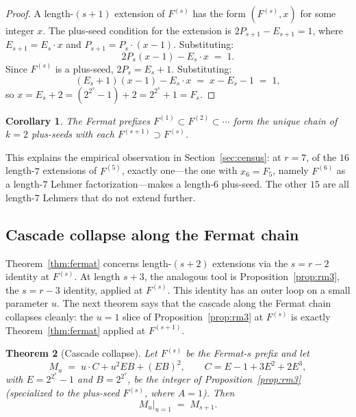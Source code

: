 \documentclass[11pt]{article}
\newtheorem{theorem}{Theorem}
\newtheorem{corollary}[theorem]{Corollary}
\theoremstyle{definition}
\theoremstyle{remark}
\begin{document}
\begin{proof}
A length-$(s+1)$ extension of $F^{(s)}$ has the form $(F^{(s)}, x)$
for some integer $x$.  The plus-seed condition for the extension is
$2 P_{s+1} - E_{s+1} = 1$, where $E_{s+1} = E_s \cdot x$ and
$P_{s+1} = P_s \cdot (x - 1)$.  Substituting:
\[
  2 P_s (x - 1) - E_s \cdot x \;=\; 1.
\]
Since $F^{(s)}$ is a plus-seed, $2 P_s = E_s + 1$.  Substituting:
\[
  (E_s + 1)(x - 1) - E_s \cdot x \;=\; x - E_s - 1 \;=\; 1,
\]
so $x = E_s + 2 = (2^{2^s} - 1) + 2 = 2^{2^s} + 1 = F_s$.
\end{proof}

\begin{corollary}\label{cor:chain-unique}
The Fermat prefixes $F^{(1)} \subset F^{(2)} \subset \cdots$ form
the unique chain of $k = 2$ plus-seeds with each
$F^{(s+1)} \supset F^{(s)}$.
\end{corollary}

This explains the empirical observation in
Section~\ref{sec:census}: at $r = 7$, of the $16$ length-$7$
extensions of $F^{(5)}$, exactly one---the one with $x_6 = F_5$, namely
$F^{(6)}$ as a length-$7$ Lehmer factorization---makes a length-$6$
plus-seed.  The other $15$ are all length-$7$ Lehmers that do not
extend further.

\subsection{Cascade collapse along the Fermat chain}
\label{subsec:cascade}

Theorem~\ref{thm:fermat} concerns length-$(s+2)$ extensions via the
$s = r - 2$ identity at $F^{(s)}$.  At length $s + 3$, the analogous
tool is Proposition~\ref{prop:rm3}, the $s = r - 3$ identity, applied
at $F^{(s)}$.  This identity has an outer loop on a small parameter
$u$.  The next theorem says that the cascade along the Fermat chain
collapses cleanly: the $u = 1$ slice of Proposition~\ref{prop:rm3}
at $F^{(s)}$ is exactly Theorem~\ref{thm:fermat} applied at
$F^{(s+1)}$.

\begin{theorem}[Cascade collapse]\label{thm:cascade}
Let $F^{(s)}$ be the Fermat-$s$ prefix and let
\[
  M_u \;=\; u \cdot C + u^2 EB + (EB)^2,
  \qquad
  C = E - 1 + 3 E^2 + 2 E^3,
\]
with $E = 2^{2^s} - 1$ and $B = 2^{2^s}$, be the integer of
Proposition~\ref{prop:rm3} (specialized to the plus-seed
$F^{(s)}$, where $A = 1$).  Then
\[
  M_u\big|_{u = 1} \;=\; M_{s+1}.
\]
\end{theorem}
\end{document}
